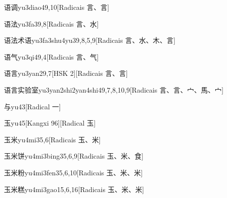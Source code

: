 \begin{entry}{语调}{yu3diao4}{9,10}[Radicais ⾔、⾔]
\end{entry}

\begin{entry}{语法}{yu3fa3}{9,8}[Radicais ⾔、⽔]
\end{entry}

\begin{entry}{语法术语}{yu3fa3shu4yu3}{9,8,5,9}[Radicais ⾔、⽔、⽊、⾔]
\end{entry}

\begin{entry}{语气}{yu3qi4}{9,4}[Radicais ⾔、⽓]
\end{entry}

\begin{entry}{语言}{yu3yan2}{9,7}[HSK 2][Radicais ⾔、⾔]
\end{entry}

\begin{entry}{语言实验室}{yu3yan2shi2yan4shi4}{9,7,8,10,9}[Radicais ⾔、⾔、⼧、⾺、⼧]
\end{entry}

\begin{entry}{与}{yu4}{3}[Radical ⼀]
\end{entry}

\begin{entry}{玉}{yu4}{5}[Kangxi 96][Radical ⽟]
\end{entry}

\begin{entry}{玉米}{yu4mi3}{5,6}[Radicais ⽟、⽶]
\end{entry}

\begin{entry}{玉米饼}{yu4mi3bing3}{5,6,9}[Radicais ⽟、⽶、⾷]
\end{entry}

\begin{entry}{玉米粉}{yu4mi3fen3}{5,6,10}[Radicais ⽟、⽶、⽶]
\end{entry}

\begin{entry}{玉米糕}{yu4mi3gao1}{5,6,16}[Radicais ⽟、⽶、⽶]
\end{entry}

